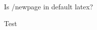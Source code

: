 \documentclass[12pt, letterpaper]{article}
\begin{document}



      


      
      







Is /newpage in default latex?

\newpage

Test
\end{document}
